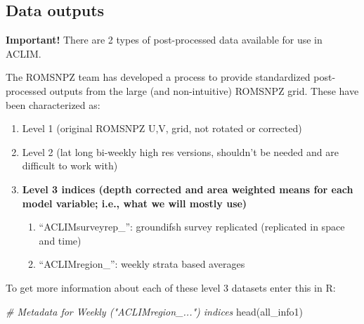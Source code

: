 \documentclass[
]{article}
\newenvironment{Shaded}{\begin{snugshade}}{\end{snugshade}}
\newcommand{\CommentTok}[1]{\textcolor[rgb]{0.56,0.35,0.01}{\textit{#1}}}
\newcommand{\FunctionTok}[1]{\textcolor[rgb]{0.00,0.00,0.00}{#1}}
\newcommand{\NormalTok}[1]{#1}
\providecommand{\tightlist}{%
  \setlength{\itemsep}{0pt}\setlength{\parskip}{0pt}}
\begin{document}
\hypertarget{data-outputs}{%
\subsection{Data outputs}\label{data-outputs}}

\textbf{Important!} There are 2 types of post-processed data available
for use in ACLIM.

The ROMSNPZ team has developed a process to provide standardized
post-processed outputs from the large (and non-intuitive) ROMSNPZ grid.
These have been characterized as:

\begin{enumerate}
\def\labelenumi{\arabic{enumi}.}
\tightlist
\item
  Level 1 (original ROMSNPZ U,V, grid, not rotated or corrected)\\
\item
  Level 2 (lat long bi-weekly high res versions, shouldn't be needed and
  are difficult to work with)\\
\item
  \textbf{Level 3 indices (depth corrected and area weighted means for
  each model variable; i.e., what we will mostly use) }

  \begin{enumerate}
  \def\labelenumii{\alph{enumii}.}
  \tightlist
  \item
    ``ACLIMsurveyrep\_'': groundifsh survey replicated (replicated in
    space and time)
  \item
    ``ACLIMregion\_'': weekly strata based averages
  \end{enumerate}
\end{enumerate}

To get more information about each of these level 3 datasets enter this
in R:

\begin{Shaded}
\begin{Highlighting}[]
    \CommentTok{\# Metadata for Weekly ("ACLIMregion\_...") indices}
    \FunctionTok{head}\NormalTok{(all\_info1)}
\end{Highlighting}
\end{Shaded}
\end{document}
